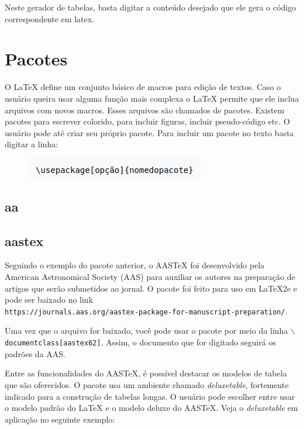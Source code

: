 \documentclass[12pt]{article}
\begin{document}
			Neste gerador de tabelas, basta digitar a conteúdo desejado que ele gera o código correspondente em latex.
		
			
	\section{Pacotes}
		O LaTeX define um conjunto básico de macros para edição de textos. Caso o usuário queira usar alguma função mais complexa o LaTeX permite que ele inclua arquivos com novos macros. Esses arquivos são chamados de pacotes. Existem pacotes para escrever colorido, para incluir figuras, incluir pseudo-código etc. O usuário pode até criar seu próprio pacote. Para incluir um pacote no texto basta digitar a linha:
	
		\begin{figure}[h]
			\centering
			\includegraphics[scale=0.6]{pa.png}
		\end{figure}	
	
		\subsection{aa}
		
		\subsection{aastex}
			Seguindo o exemplo do pacote anterior, o AASTeX foi desenvolvido pela American Astronomical Society (AAS) para auxiliar os autores na preparação de artigos que serão submetidos ao jornal. O pacote foi feito para uso em LaTeX2e e pode ser baixado no link\\ \texttt{https://journals.aas.org/aastex-package-for-manuscript-preparation/}.
			
			Uma vez que o arquivo for baixado, você pode usar o pacote por meio da linha \texttt{$\backslash$documentclass[aastex62]}. Assim, o documento que for digitado seguirá os padrões da AAS.
			
			Entre as funcionalidades do AASTeX, é possível destacar os modelos de tabela que são oferecidos. O pacote usa um ambiente chamado \textit{deluxetable}, fortemente indicado para a construção de tabelas longas. O usuário pode escolher entre usar o modelo padrão do LaTeX e o modelo deluxe do AASTeX. Veja o \textit{deluxetable} em aplicação no seguinte exemplo:
			
\end{document}
